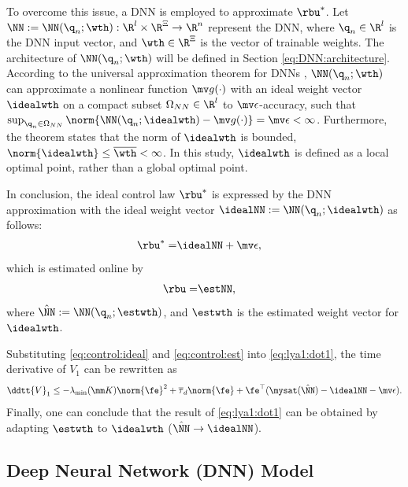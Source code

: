 \documentclass[lettersize,journal]{IEEEtran}
\begin{document}
To overcome this issue, a DNN is employed to approximate $\rbu^*$.
Let $\NN:=\NN({\q}_n;\wth): \R^{l}\times\R^{\Xi}\to\R^{n}$ represent the DNN, where ${\q}_n\in\R^{l}$ is the DNN input vector, and $\wth\in\R^{\Xi}$ is the vector of trainable weights.
The architecture of $\NN({\q}_n;\wth)$ will be defined in Section \ref{eq:DNN:architecture}.
According to the universal approximation theorem for DNNs \cite{Kidger:2020aa}, $\NN({\q}_n;\wth)$ can approximate a nonlinear function $\mv g(\cdot)$ with an ideal weight vector $\idealwth$ on a compact subset $\Omega_{NN}\in\R^{l}$ to $\mv\epsilon$-accuracy, such that $\sup_{{\q}_n\in\Omega_{NN}}\norm{ \NN({\q}_n;\idealwth) - \mv g(\cdot)} = \mv\epsilon < \infty$.
Furthermore, the theorem states that the norm of $\idealwth$ is bounded, \ie $\norm{\idealwth}\le \overline\wth<\infty$.
In this study, $\idealwth$ is defined as a local optimal point, rather than a global optimal point.

In conclusion, the ideal control law $\rbu^*$ is expressed by the DNN approximation with the ideal weight vector $\idealNN:=\NN({\q}_n;\idealwth)$ as follows:
\begin{align}
    \rbu^*=& \idealNN+\mv\epsilon,
    \label{eq:control:ideal}
\end{align}
which is estimated online by
\begin{align}
    \rbu =& \estNN,
    \label{eq:control:est}
\end{align}
where $\hat\NN:=\NN({\q}_n;\estwth)$, and  $\estwth$ is the estimated weight vector for $\idealwth$.

Substituting \eqref{eq:control:ideal} and \eqref{eq:control:est} into \eqref{eq:lya1:dot1}, the time derivative of $V_1$ can be rewritten as
\begin{equation}
    \ddtt{V}_1
    \le 
    -\lambda_{\min}(\mm K)\norm{\fe}^2
    +
    \overline\tau_d\norm{\fe}
    +
    \fe^\top (\mysat(\hat\NN)-\idealNN-\mv\epsilon)
    .
    \label{eq:lya1:dot2}
\end{equation}
Finally, one can conclude that the result of \eqref{eq:lya1:dot1} can be obtained by adapting $\estwth$ to $\idealwth$ (\ie $\hat\NN\to\idealNN$).

\subsection{Deep Neural Network (DNN) Model}\label{sec:sub:NN definition}
\end{document}
